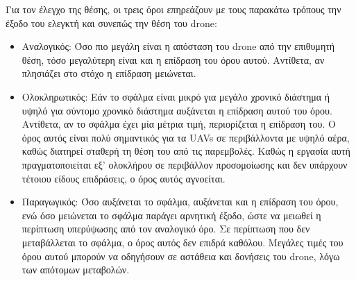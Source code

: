Για τον έλεγχο της θέσης, οι τρεις όροι επηρεάζουν με τους παρακάτω τρόπους την έξοδο του ελεγκτή και συνεπώς την θέση του drone: 
\begin{itemize}
    \item {Αναλογικός: Όσο πιο μεγάλη είναι η απόσταση του drone από την επιθυμητή θέση, τόσο μεγαλύτερη είναι και η επίδραση του όρου αυτού. Αντίθετα, αν πλησιάζει στο στόχο η επίδραση μειώνεται.}
    \item {Ολοκληρωτικός: Εάν το σφάλμα είναι μικρό για μεγάλο χρονικό διάστημα ή υψηλό για σύντομο χρονικό διάστημα αυξάνεται η επίδραση αυτού του όρου. Αντίθετα, αν το σφάλμα έχει μία μέτρια τιμή, περιορίζεται η επίδραση του. Ο όρος αυτός είναι πολύ σημαντικός για τα UAVs σε περιβάλλοντα με υψηλό αέρα, καθώς διατηρεί σταθερή τη θέση του από τις παρεμβολές. Καθώς η εργασία αυτή πραγματοποιείται εξ' ολοκλήρου σε περιβάλλον προσομοίωσης και δεν υπάρχουν τέτοιου είδους επιδράσεις, ο όρος αυτός αγνοείται.}
    \item {Παραγωγικός: Όσο αυξάνεται το σφάλμα, αυξάνεται και η επίδραση του όρου, ενώ όσο μειώνεται το σφάλμα παράγει αρνητική έξοδο, ώστε να μειωθεί η περίπτωση υπερύψωσης από τον αναλογικό όρο. Σε περίπτωση που δεν μεταβάλλεται το σφάλμα, ο όρος αυτός δεν επιδρά καθόλου. Μεγάλες τιμές του όρου αυτού μπορούν να οδηγήσουν σε αστάθεια και δονήσεις του drone, λόγω των απότομων μεταβολών.}
\end{itemize}
